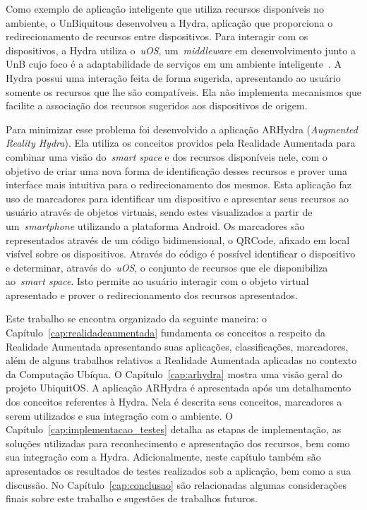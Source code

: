 	Como exemplo de aplicação inteligente que utiliza recursos disponíveis no ambiente, o UnBiquitous desenvolveu 
	a Hydra, aplicação que proporciona o redirecionamento de recursos entre dispositivos. Para interagir com os 
	dispositivos, a Hydra utiliza o~\textit{uOS}, um~\textit{middleware} em desenvolvimento junto a UnB cujo foco 
	é a adaptabilidade de serviços em um ambiente inteligente~\cite{almeida,buzeto}. A Hydra possui uma interação 
	feita de forma sugerida, apresentando ao usuário somente os recursos que lhe são compatíveis. Ela não 
	implementa mecanismos que facilite a associação dos recursos sugeridos aos dispositivos de origem.  
	
	Para minimizar esse problema foi desenvolvido a aplicação ARHydra (\textit{Augmented Reality Hydra}). Ela
	utiliza os conceitos providos pela Realidade Aumentada para combinar uma visão do~\textit{smart space}
	e dos recursos disponíveis nele, com o objetivo de criar uma nova forma de identificação desses recursos e 
	prover uma interface mais intuitiva para o redirecionamento dos mesmos. Esta aplicação faz uso de 
	marcadores para identificar um dispositivo e apresentar seus recursos ao usuário através de objetos virtuais, 
	sendo estes visualizados a partir de um~\textit{smartphone} utilizando a plataforma Android. Os marcadores são 
	representados através de um código bidimensional, o QRCode, afixado em local visível sobre os dispositivos. 
	Através do código é possível identificar o dispositivo e determinar, através do~\textit{uOS}, o conjunto de 
	recursos que ele disponibiliza ao~\textit{smart space}. Isto permite ao usuário interagir
	com o objeto virtual apresentado e prover o redirecionamento dos recursos apresentados.
	
	Este trabalho se encontra organizado da seguinte maneira: o Capítulo~\ref{cap:realidadeaumentada} 
	fundamenta os conceitos a respeito da Realidade Aumentada apresentando suas aplicações, classificações,
	marcadores, além de alguns trabalhos relativos a Realidade Aumentada aplicadas no contexto da Computação 
	Ubíqua. O Capítulo~\ref{cap:arhydra} mostra uma visão geral do projeto UbiquitOS. A aplicação 
	ARHydra é apresentada após um detalhamento dos conceitos referentes à Hydra. Nela é descrita seus
	conceitos, marcadores a serem utilizados e sua integração com o ambiente. O 
	Capítulo~\ref{cap:implementacao_testes} detalha as etapas de implementação, as soluções utilizadas
	para reconhecimento e apresentação dos recursos, bem como sua integração com a Hydra. Adicionalmente,
	neste capítulo também são apresentados os resultados de testes realizados sob a aplicação, bem como a sua 
	discussão. No Capítulo~\ref{cap:conclusao} são relacionadas algumas considerações finais sobre este trabalho 
	e sugestões de trabalhos futuros. 
	
	
 